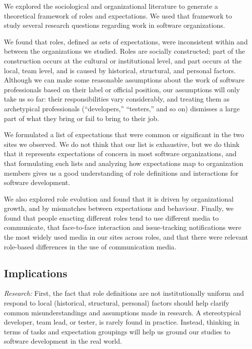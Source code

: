 \documentclass[10pt, conference, compsocconf]{IEEEtran}
\begin{document}
We explored the sociological and organizational literature to generate a theoretical framework of roles and expectations. We used that framework to study several research questions regarding work in software organizations.

We found that roles, defined as sets of expectations, were inconsistent within and between the organizations we studied. Roles are socially constructed; part of the construction occurs at the cultural or institutional level, and part occurs at the local, team level, and is caused by historical, structural, and personal factors. Although we can make some reasonable assumptions about the work of software professionals based on their label or official position, our assumptions will only take us so far: their responsibilities vary considerably, and treating them as archetypical professionals (``developers,'' ``testers,'' and so on) dismisses a large part of what they bring or fail to bring to their job.

We formulated a list of expectations that were common or significant in the two sites we observed. We do not think that our list is exhaustive, but we do think that it represents expectations of concern in most software organizations, and that formulating such lists and analyzing how expectations map to organization members gives us a good understanding of role definitions and interactions for software development.

We also explored role evolution and found that it is driven by organizational growth, and by mismatches between expectations and behaviour. Finally, we found that people enacting different roles tend to use different media to communicate, that face-to-face interaction and issue-tracking notifications were the most widely used media in our sites across roles, and that there were relevant role-based differences in the use of communication media.


\subsection{Implications}

\emph{Research:} First, the fact that role definitions are not institutionally uniform and respond to local (historical, structural, personal) factors should help clarify common misunderstandings and assumptions made in research. A stereotypical developer, team lead, or tester, is rarely found in practice. Instead, thinking in terms of tasks and expectation groupings will help us ground our studies to software development in the real world.
\end{document}
